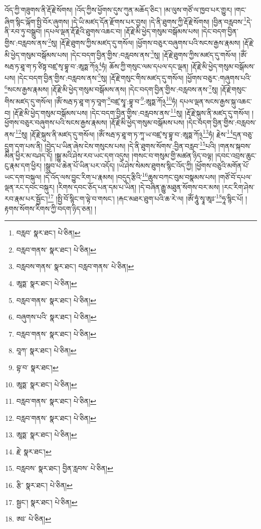 འོད་ཀྱི་གཟུགས་ནི་རྡོ་རྗེ་སོགས། །འོད་ཀྱིས་ཕྱོགས་དུས་ཀུན་མཆོད་ཅིང་། །མ་ལུས་གཙོ་ལ་ཁྱབ་པར་གྱུར། །གང་ཞིག་སྙིང་ལྐོག་སྤྱི་བོར་ཞུགས། །དེ་ཡི་མཛད་དོན་རྫོགས་པར་བྱས། །དེ་ནི་ཐུགས་ཀྱི་རྡོ་རྗེ་སོགས། །བྱིན་བརླབས་\footnote{བརླབ་  སྣར་ཐང་།  པེ་ཅིན། }དེ་ནི་རབ་ཏུ་བསྒྲུབ། །དཔལ་ལྡན་རྡོ་རྗེའི་ཐུགས་འཆང་བ། །རྡོ་རྗེ་མི་ཕྱེད་གསུམ་བསྒོམས་པས། །དེང་བདག་བྱིན་གྱིས་:བརླབས་ནས་\footnote{བརླབ་གནས་  སྣར་ཐང་།  པེ་ཅིན། }སུ། །རྡོ་རྗེ་ཐུགས་ཀྱིས་མཛད་དུ་གསོལ། །ཕྱོགས་བཅུར་བཞུགས་པའི་སངས་རྒྱས་རྣམས། །རྡོ་རྗེ་མི་ཕྱེད་གསུམ་བསྒོམས་པས། །དེང་བདག་བྱིན་གྱིས་:བརླབས་ནས་\footnote{བརླབས་གནས་  སྣར་ཐང་། བརླབ་གནས་  པེ་ཅིན། }སུ། །རྡོ་རྗེ་ཐུགས་ཀྱིས་མཛད་དུ་གསོལ། །ཨོཾ་སརྦ་ཏ་ཐཱ་ག་ཏ་ཙིཏྟ་བཛྲ་སྭ་བྷཱ་བ་:ཨཱཏྨ་ཀོ྅\footnote{ཨཱཏྨ་  སྣར་ཐང་།  པེ་ཅིན། }ཧཾ། ཆོས་ཀྱི་གསུང་ལམ་དཔལ་དང་ལྡན། །རྡོ་རྗེ་མི་ཕྱེད་གསུམ་བསྒོམས་པས། །དེང་བདག་བྱིན་གྱིས་:བརླབས་ནས་\footnote{བརླབ་གནས་  སྣར་ཐང་།  པེ་ཅིན། }སུ། །རྡོ་རྗེ་གསུང་གིས་མཛད་དུ་གསོལ། །ཕྱོགས་བཅུར་:གཞུགས་པའི་\footnote{བཞུགས་པའི་  སྣར་ཐང་།  པེ་ཅིན། }སངས་རྒྱས་རྣམས། །རྡོ་རྗེ་མི་ཕྱེད་གསུམ་བསྒོམས་ནས། །དེང་བདག་བྱིན་གྱིས་:བརླབས་ནས་\footnote{བརླབ་གནས་  སྣར་ཐང་།  པེ་ཅིན། }སུ། །རྡོ་རྗེ་གསུང་གིས་མཛད་དུ་གསོལ། །ཨོཾ་སརྦ་ཏ་ཐཱ་ག་ཏ་བཱག་\footnote{བཱཀ་  སྣར་ཐང་།  པེ་ཅིན། }བཛྲ་སྭཱ་:བྷཱ་བ་\footnote{བྷ་བ་  སྣར་ཐང་། }:ཨཱཏྨ་ཀོ྅\footnote{ཨཱཏྨ་  སྣར་ཐང་།  པེ་ཅིན། }ཧཾ། དཔལ་ལྡན་སངས་རྒྱས་སྐུ་འཆང་བ། །རྡོ་རྗེ་མི་ཕྱེད་གསུམ་བསྒོམས་པས། །དེང་བདག་བྱིན་གྱིས་:བརླབས་ནས་\footnote{བརླབ་གནས་  སྣར་ཐང་།  པེ་ཅིན། }སུ། །རྡོ་རྗེ་སྐུས་ནི་མཛད་དུ་གསོལ། །ཕྱོགས་བཅུར་བཞུགས་པའི་སངས་རྒྱས་རྣམས། །རྡོ་རྗེ་མི་ཕྱེད་གསུམ་བསྒོམས་པས། །དེང་བདག་བྱིན་གྱིས་:བརླབས་ནས་\footnote{བརླབ་གནས་  སྣར་ཐང་།  པེ་ཅིན། }སུ། །རྡོ་རྗེ་སྐུས་ནི་མཛད་དུ་གསོལ། །ཨོཾ་སརྦ་ཏ་ཐཱ་ག་ཏ་ཀཱ་ཡ་བཛྲ་སྭ་བྷཱ་བ་:ཨཱཏྨ་ཀོ྅\footnote{ཨཱཏྨ་  སྣར་ཐང་།  པེ་ཅིན། }ཧཾ། རྗེས་\footnote{རྗེ་  སྣར་ཐང་། }དྲན་བཅུ་དྲུག་དག་པས་ནི། །བྱེད་པ་ཡིན་ཞེས་ངེས་གསུངས་པས། །དེ་ནི་ཐུགས་སོགས་:བྱིན་བརླབ་\footnote{བརླབས་  སྣར་ཐང་། བྱིན་རླབས་  པེ་ཅིན། }པའི། །གནས་སྐབས་མིན་ཕྱིར་མ་བཤད་དོ། །སྒྱུ་མའི་ཤེས་རབ་ཡང་དག་འདུས། །གསང་བ་གསུམ་གྱི་མཚན་ཉིད་བལྟ། །དབང་འབྲས་ཆུང་ངུ་རྣམ་དག་ཕྱིར། །སྒྲུབ་པ་ཆེན་པོ་ཡིན་པར་འདོད། །ཡེ་ཤེས་སེམས་ཐུགས་སྙིང་འོད་ཀྱི། །ཕྱོགས་བཅུའི་མགོན་པོ་ཡང་དག་བསྐུལ། །དེ་འོད་ལས་བྱུང་རིག་པ་རྣམས། །བདུད་རྩིའི་\footnote{རྩི་  སྣར་ཐང་།  པེ་ཅིན། }ཆུས་བཀང་བུམ་བསྣམས་པས། །གཙོ་བོ་དཔལ་ལྡན་རང་དབང་བསྐུར། །རིགས་དབང་ཅོད་པན་དམ་པ་ཡིན། །དེ་བཞིན་རྒྱུ་མཐུན་སོགས་བར་མས། །རང་རིག་ཤེས་རབ་རྣམ་པར་སྦྱོང་།\footnote{སྦྱང་།  སྣར་ཐང་།  པེ་ཅིན། } །སྤྱི་བོ་སྙིང་ག་ལྟེ་བ་གསང་། །རྐང་མཐར་ཐུག་པའི་ཆ་རེ་ལ། །ཨོཾ་ཧཱུཾ་སྭཱ་ཨཱཿ་\footnote{ཨཿ་  པེ་ཅིན། }ཧཱ་སྙིང་པོ། །རྟགས་སོགས་རིགས་ཀྱི་བདག་ཉིད་ཅན། །
